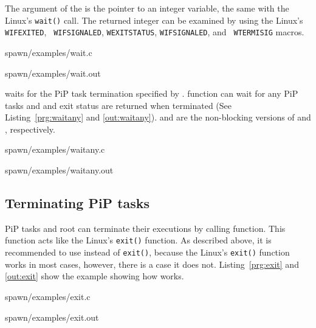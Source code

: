The argument of the  is the pointer to an integer
variable, the same with the Linux's {\tt wait()} call. The returned
integer can be examined by using the Linux's {\tt WIFEXITED}, {\tt
  WIFSIGNALED}, {\tt WEXITSTATUS}, {\tt WIFSIGNALED}, and {\tt
  WTERMISIG} macros.


                {spawn/examples/wait.c}

 {spawn/examples/wait.out}

 waits for the PiP task termination specified by
        {\PIPID}. 
 function can wait for any PiP tasks and
        {\PIPID} and exit status are returned when terminated (See
        Listing~\ref{prg:waitany} and \ref{out:waitany}).
         and  are
        the non-blocking versions of  and
        , respectively. 


                {spawn/examples/waitany.c}

 {spawn/examples/waitany.out}


\subsection{Terminating PiP tasks}

PiP tasks and root can terminate their executions by calling
 function. This function acts like the Linux's
        {\tt exit()} function. As described above, it is recommended
        to use  
        instead of {\tt exit()}, because the Linux's {\tt exit()}
        function works in most cases, however, there is a case it does
        not. Listing~\ref{prg:exit} and \ref{out:exit} show the
        example showing how  works.

 {spawn/examples/exit.c}

 {spawn/examples/exit.out}


